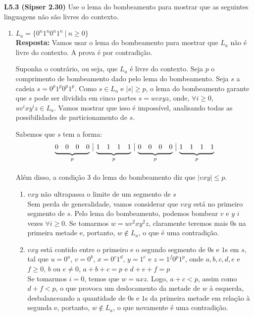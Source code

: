 
\noindent \textbf{L5.3 (Sipser 2.30)} Use o lema do bombeamento para mostrar que as seguintes linguagens não são livres do contexto.
\begin{enumerate}[label={\textbf{\alph*.}}]
    
    \item $L_a = \{0^n1^n0^n1^n \ |\ n \geq 0\}$\\[3pt]
    \textbf{Resposta:} Vamos usar o lema do bombeamento para mostrar que $L_a$ não é livre do contexto. A prova é por contradição.
    
    Suponha o contrário, ou seja, que $L_a$ é livre do contexto. Seja $p$ o comprimento de bombeamento dado pelo lema do bombeamento. Seja $s$ a cadeia $s = 0^p1^p0^p1^p$. Como $s \in L_a$ e $|s| \geq p$, o lema do bombeamento garante que $s$ pode ser dividida em cinco partes $s = uvxyz$, onde, $\forall i \geq 0$, $uv^ixy^iz \in L_a$. Vamos mostrar que isso é impossível, analisando todas as possibilidades de particionamento de $s$.
    
    Sabemos que $s$ tem a forma:
    \[
    \begin{array}{rrrr|rrrr|rrrr|rrrr}
        \undermat{p}{0&0&0&0} & \undermat{p}{1&1&1&1} & \undermat{p}{0&0&0&0} & \undermat{p}{1&1&1&1} \\
    \end{array}
    \]
    \
    
    Além disso, a condição 3 do lema do bombeamento diz que $|vxy| \leq p$.
    
    \begin{enumerate}[label={\textbf{Caso \arabic*:}}]
        \item $vxy$ não ultrapassa o limite de um segmento de $s$\\[2pt]
        Sem perda de generalidade, vamos considerar que $vxy$ está no primeiro segmento de $s$. Pelo lema do bombeamento, podemos bombear $v$ e $y$ $i$ vezes $\forall i \geq 0$. Se tomarmos $w = uv^2xy^2z$, claramente teremos mais $0$s na primeira metade e, portanto, $w \notin L_a$, o que é uma contradição.
        
        \item $vxy$ está contido entre o primeiro e o segundo segmento de $0$s e $1$s em $s$, tal que $u = 0^a$, $v = 0^b$, $x = 0^c1^d$, $y = 1^e$ e $z = 1^f0^p1^p$, onde $a, b, c, d, e$ e $f \geq 0$, $b$ ou $e \neq 0$, $a + b + c = p$ e $d + e + f = p$\\[2pt]
        Se tomarmos $i = 0$, temos que $w = uxz$. Logo, $a + c < p$, assim como $d + f < p$, o que provoca um deslocamento da metade de $w$ à esquerda, desbalanceando a quantidade de $0$s e $1$s da primeira metade em relação à segunda e, portanto, $w \notin L_a$, o que novamente é uma contradição.
        

\end{enumerate}
\end{enumerate}

